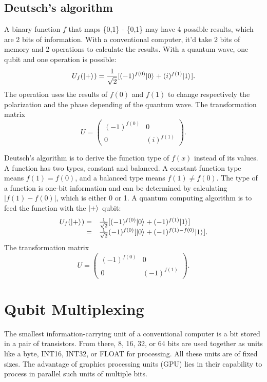 \documentclass[oneside, letter, 12pt]{book}
\begin{document}
\section{Deutsch's algorithm}
A binary function $f$ that maps \{0,1\} -\> \{0,1\} may have 4 possible results, which are 2 bits of information. With a conventional computer, it'd take 2 bits of memory and 2 operations to calculate the results. With a quantum wave, one qubit and one operation is possible:
\begin{equation}
    U_f(\vert {+} \rangle_{}) = \frac 1 {\sqrt 2} [(-1)^{f(0)} \vert {0} \rangle_{} + (i)^{f(1)} \vert {1} \rangle_{}].
\end{equation}
The operation uses the results of $f(0)$ and $f(1)$ to change respectively the polarization and the phase depending of the quantum wave. The transformation matrix
\begin{equation}
    U = \begin{pmatrix}
        (-1)^{f(0)} & 0 \\
        0 & (i)^{f(1)}
    \end{pmatrix}.
\end{equation}

Deutsch's algorithm is to derive the function type of $f(x)$ instead of its values. A function has two types, constant and balanced. A constant function type means $f(1)=f(0)$, and a balanced type means $f(1)\neq f(0)$. The type of a function is one-bit information and can be determined by calculating $|f(1)-f(0)|$, which is either 0 or 1. A quantum computing algorithm is to feed the function with the $\vert {+} \rangle_{}$ qubit:
\begin{equation}
\begin{array}{rl}
    U_f(\vert {+} \rangle_{}) = & \frac 1 {\sqrt 2} [(-1)^{f(0)} \vert {0} \rangle_{}+ (-1)^{f(1)} \vert {1} \rangle_{}] \\
    = & \frac 1 {\sqrt 2} (-1)^{f(0)} [\vert {0} \rangle_{}+ (-1)^{f(1)-f(0)} \vert {1} \rangle_{}].
\end{array}
\end{equation}
The transformation matrix
\begin{equation}
    U = \begin{pmatrix}
        (-1)^{f(0)} & 0 \\
        0 & (-1)^{f(1)}
    \end{pmatrix}.
\end{equation}

\chapter{Qubit Multiplexing}\label{c-qubitMultiplexing}
The smallest information-carrying unit of a conventional computer is a bit stored in a pair of transistors. From there, 8, 16, 32, or 64 bits are used together as units like a byte, INT16, INT32, or FLOAT for processing. All these units are of fixed sizes. The advantage of graphics processing units (GPU) lies in their capability to process in parallel such units of multiple bits.
\end{document}

